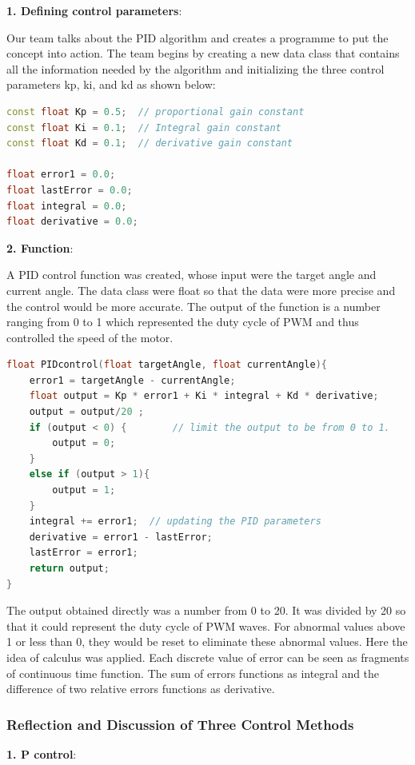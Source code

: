 \documentclass[12pt, a4paper, oneside]{report}
\begin{document}
\textbf{1. Defining control parameters}: 

Our team talks about the PID algorithm and creates a programme to put the concept into action. The team begins by creating a new data class that contains all the information needed by the algorithm and initializing the three control parameters kp, ki, and kd as shown below:
\begin{lstlisting}[language=C++]
const float Kp = 0.5;  // proportional gain constant 
const float Ki = 0.1;  // Integral gain constant 
const float Kd = 0.1;  // derivative gain constant

float error1 = 0.0;
float lastError = 0.0;
float integral = 0.0;
float derivative = 0.0;
\end{lstlisting}

\textbf{2. Function}: 

A PID control function was created, whose input were the target angle and current angle. The data class were float so that the data were more precise and the control would be more accurate. The output of the function is a number ranging from 0 to 1 which represented the duty cycle of PWM and thus controlled the speed of the motor.
\begin{lstlisting}[language=C++]
float PIDcontrol(float targetAngle, float currentAngle){
    error1 = targetAngle - currentAngle;
    float output = Kp * error1 + Ki * integral + Kd * derivative; 
    output = output/20 ;
    if (output < 0) {        // limit the output to be from 0 to 1.
        output = 0;
    } 
    else if (output > 1){
        output = 1;
    }
    integral += error1;  // updating the PID parameters
    derivative = error1 - lastError;
    lastError = error1;
    return output;
}  
\end{lstlisting}
The output obtained directly was a number from 0 to 20. It was divided by 20 so that it could represent the duty cycle of PWM waves. For abnormal values above 1 or less than 0, they would be reset to eliminate these abnormal values. Here the idea of calculus was applied. Each discrete value of error can be seen as fragments of continuous time function. The sum of errors functions as integral and the difference of two relative errors functions as derivative.

\subsubsection{Reflection and Discussion of Three Control Methods}
\textbf{1. P control}: 
\end{document}
